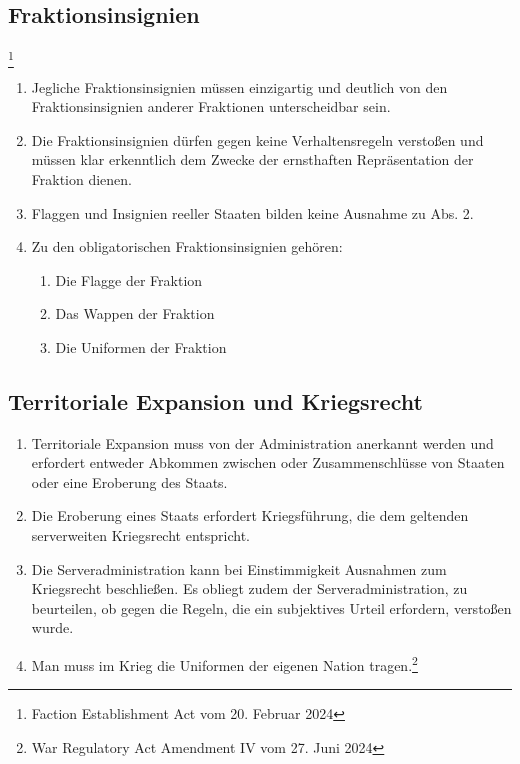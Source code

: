 \documentclass{article}
\begin{document}
\subsection{Fraktionsinsignien}\footnote{Faction Establishment Act vom 20. Februar 2024}
\begin{enumerate}[(1)]
    \item Jegliche Fraktionsinsignien müssen einzigartig und deutlich von den Fraktionsinsignien anderer Fraktionen unterscheidbar sein.
    \item Die Fraktionsinsignien dürfen gegen keine Verhaltensregeln verstoßen und müssen klar erkenntlich dem Zwecke der ernsthaften Repräsentation der Fraktion dienen.
    \item Flaggen und Insignien reeller Staaten bilden keine Ausnahme zu Abs. 2.
    \item Zu den obligatorischen Fraktionsinsignien gehören:
    \begin{enumerate}[1.]
        \item Die Flagge der Fraktion
        \item Das Wappen der Fraktion
        \item Die Uniformen der Fraktion
    \end{enumerate}
\end{enumerate}

\subsection{Territoriale Expansion und Kriegsrecht}
\begin{enumerate}[(1)]
    \item Territoriale Expansion muss von der Administration anerkannt werden und erfordert entweder Abkommen zwischen oder Zusammenschlüsse von Staaten oder eine Eroberung des Staats.
    \item Die Eroberung eines Staats erfordert Kriegsführung, die dem geltenden serverweiten Kriegsrecht entspricht.
    \item Die Serveradministration kann bei Einstimmigkeit Ausnahmen zum Kriegsrecht beschließen. Es obliegt zudem der Serveradministration, zu beurteilen, ob gegen die Regeln, die ein subjektives Urteil erfordern, verstoßen wurde. %
    \item Man muss im Krieg die Uniformen der eigenen Nation tragen.\footnote{War Regulatory Act Amendment IV vom 27. Juni 2024}
\end{enumerate}
\end{document}
